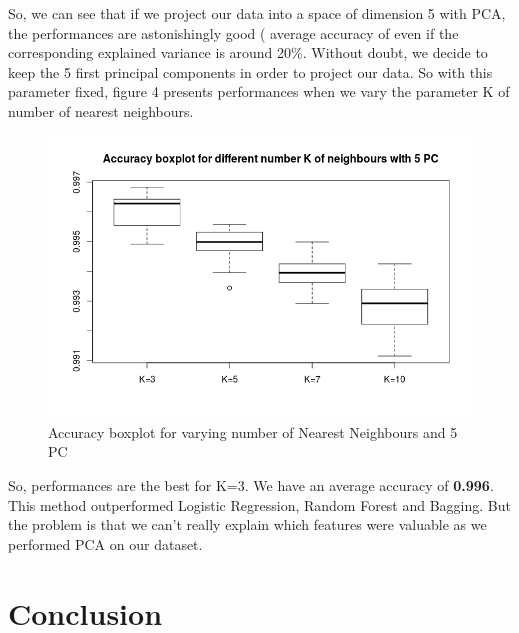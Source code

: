 \documentclass[11pt]{article}
\begin{document}
So, we can see that if we project our data into a space of dimension 5 with PCA, the performances are astonishingly good ( average accuracy of even if the corresponding explained variance is around 20\%. Without doubt, we decide to keep the 5 first principal components in order to project our data. 
\newpage
So with this parameter fixed, figure 4 presents performances when we vary the parameter K of number of nearest neighbours. 

\begin{figure}[h]
\begin{center}
\includegraphics[scale=0.7]{images/Knn_accuracy.png}

\end{center}
\caption{Accuracy boxplot for varying number of Nearest Neighbours and 5 PC}
\end{figure}



So, performances are the best for K=3. We have an average accuracy of \textbf{0.996}. This method outperformed Logistic Regression, Random Forest and Bagging.  But the problem is that we can't really explain which features were valuable as we performed PCA on our dataset.



\section{Conclusion}
\end{document}
